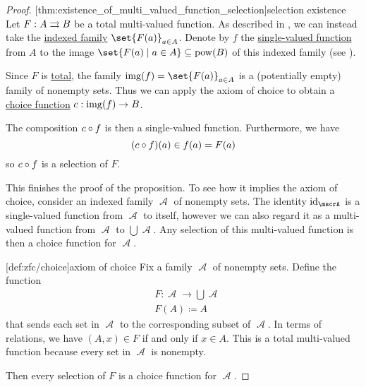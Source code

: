 \begin{proof}
  [thm:existence_of_multi_valued_function_selection]{selection existence} Let \( F: A \rightrightarrows B \) be a total multi-valued function. As described in , we can instead take the \hyperref[def:indexed_family]{indexed family} \( \set{ F(a) }_{a \in A} \). Denote by \( f \) the \hyperref[def:function]{single-valued function} from \( A \) to the image \( \set{ F(a) \given a \in A } \subseteq \pow(B) \) of this indexed family (see ).

  Since \( F \) is \hyperref[def:multi_valued_function/total]{total}, the family \( \img(f) = \set{ F(a) }_{a \in A} \) is a (potentially empty) family of nonempty sets. Thus we can apply the axiom of choice to obtain a \hyperref[def:choice_function]{choice function} \( c: \operatorname{img}(f) \to B \).

  The composition \( c \mathbin \circ f \) is then a single-valued function. Furthermore, we have
  \begin{equation*}
    (c \mathbin \circ f)(a) \in f(a) = F(a)
  \end{equation*}
  so \( c \mathbin \circ f \) is a selection of \( F \).

  This finishes the proof of the proposition. To see how it implies the axiom of choice, consider an indexed family \( \mscrA \) of nonempty sets. The identity \( \id_\mscrA \) is a single-valued function from \( \mscrA \) to itself, however we can also regard it as a multi-valued function from \( \mscrA \) to \( \bigcup \mscrA \). Any selection of this multi-valued function is then a choice function for \( \mscrA \).

  [def:zfc/choice]{axiom of choice} Fix a family \( \mscrA \) of nonempty sets. Define the function
  \begin{equation*}
    \begin{aligned}
      &F: \mscrA \to \bigcup \mscrA \\
      &F(A) \coloneqq A
    \end{aligned}
  \end{equation*}
  that sends each set in \( \mscrA \) to the corresponding subset of \( \mscrA \). In terms of relations, we have \( (A, x) \in F \) if and only if \( x \in A \). This is a total multi-valued function because every set in \( \mscrA \) is nonempty.

  Then every selection of \( F \) is a choice function for \( \mscrA \).
\end{proof}

